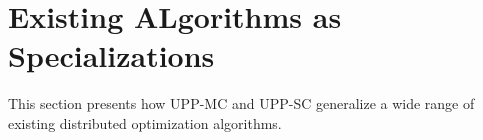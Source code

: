 \documentclass[12pt,draftcls,onecolumn]{IEEEtran}
\begin{document}


\section{Existing ALgorithms as Specializations}\label{section: specializations}
This section presents how UPP-MC and UPP-SC generalize a wide range of existing distributed optimization algorithms.
\end{document}
